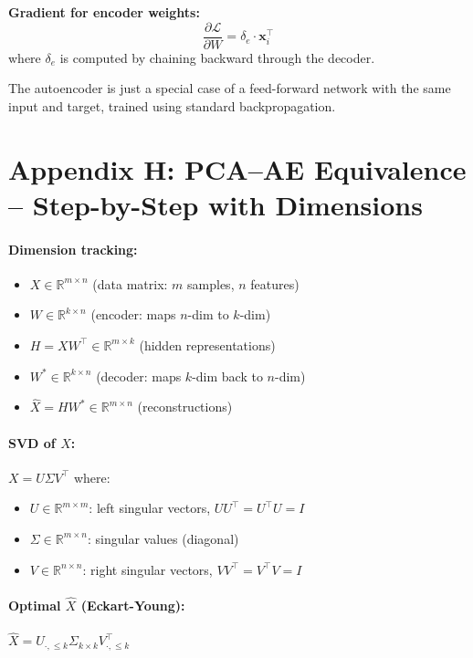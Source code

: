 \documentclass[12pt,a4paper]{article}
\newcommand{\R}{\mathbb{R}}
\newcommand{\vx}{\mathbf{x}}
\newcommand{\Loss}{\mathcal{L}}
\begin{document}
\textbf{Gradient for encoder weights:}
\[
  \frac{\partial\Loss}{\partial W}
  = \delta_e \cdot \vx_i^\top
\]
where $\delta_e$ is computed by chaining backward through the decoder.

The autoencoder is just a special case of a feed-forward network with the same input and target, trained using standard backpropagation.

\section{Appendix H: PCA--AE Equivalence -- Step-by-Step with Dimensions}

\paragraph{Dimension tracking:}
\begin{itemize}
  \item $X \in \R^{m\times n}$ (data matrix: $m$ samples, $n$ features)
  \item $W \in \R^{k\times n}$ (encoder: maps $n$-dim to $k$-dim)
  \item $H = XW^\top \in \R^{m\times k}$ (hidden representations)
  \item $W^* \in \R^{k\times n}$ (decoder: maps $k$-dim back to $n$-dim)
  \item $\hat{X} = HW^* \in \R^{m\times n}$ (reconstructions)
\end{itemize}

\paragraph{SVD of $X$:}
$X = U\Sigma V^\top$ where:
\begin{itemize}
  \item $U \in \R^{m\times m}$: left singular vectors, $UU^\top = U^\top U = I$
  \item $\Sigma \in \R^{m\times n}$: singular values (diagonal)
  \item $V \in \R^{n\times n}$: right singular vectors, $VV^\top = V^\top V = I$
\end{itemize}

\paragraph{Optimal $\hat{X}$ (Eckart-Young):}
$\hat{X} = U_{\cdot,\leq k}\Sigma_{k\times k}V_{\cdot,\leq k}^\top$
\end{document}
